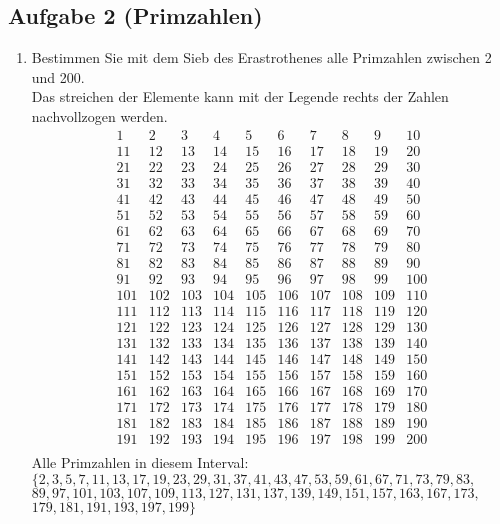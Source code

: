 \documentclass[11pt,a4paper,ngerman]{article}
\begin{document}
\subsection*{Aufgabe 2 (Primzahlen)}

\begin{enumerate}[\bfseries a)]

\item Bestimmen Sie mit dem Sieb des Erastrothenes alle Primzahlen zwischen 2 und 200. \\
Das streichen der Elemente kann mit der Legende rechts der Zahlen nachvollzogen werden.\\
$$
\begin{array}{cccccccccc}
1 & 2 & 3 & 4 & 5 & 6 & 7 & 8 & 9 & 10 \\
11 & 12 & 13 & 14 & 15 & 16 & 17 & 18 & 19 & 20 \\
21 & 22 & 23 & 24 & 25 & 26 & 27 & 28 & 29 & 30 \\
31 & 32 & 33 & 34 & 35 & 36 & 37 & 38 & 39 & 40 \\
41 & 42 & 43 & 44 & 45 & 46 & 47 & 48 & 49 & 50 \\
51 & 52 & 53 & 54 & 55 & 56 & 57 & 58 & 59 & 60 \\
61 & 62 & 63 & 64 & 65 & 66 & 67 & 68 & 69 & 70 \\
71 & 72 & 73 & 74 & 75 & 76 & 77 & 78 & 79 & 80 \\
81 & 82 & 83 & 84 & 85 & 86 & 87 & 88 & 89 & 90 \\
91 & 92 & 93 & 94 & 95 & 96 & 97 & 98 & 99 & 100 \\
101 & 102 & 103 & 104 & 105 & 106 & 107 & 108 & 109 & 110 \\
111 & 112 & 113 & 114 & 115 & 116 & 117 & 118 & 119 & 120 \\
121 & 122 & 123 & 124 & 125 & 126 & 127 & 128 & 129 & 130 \\
131 & 132 & 133 & 134 & 135 & 136 & 137 & 138 & 139 & 140 \\
141 & 142 & 143 & 144 & 145 & 146 & 147 & 148 & 149 & 150 \\
151 & 152 & 153 & 154 & 155 & 156 & 157 & 158 & 159 & 160 \\
161 & 162 & 163 & 164 & 165 & 166 & 167 & 168 & 169 & 170 \\
171 & 172 & 173 & 174 & 175 & 176 & 177 & 178 & 179 & 180 \\
181 & 182 & 183 & 184 & 185 & 186 & 187 & 188 & 189 & 190 \\
191 & 192 & 193 & 194 & 195 & 196 & 197 & 198 & 199 & 200 \\
\end{array}
$$
Alle Primzahlen in diesem Interval:\\
$\{2, 3, 5, 7, 11 ,13, 17, 19,23, 29, 31, 37, 41, 43, 47, 53, 59, 61, 67, 71, 73, 79, 83,$\\
$ 89, 97, 101, 103, 107, 109, 113, 127, 131, 137, 139, 149, 151, 157, 163, 167, 173,$\\
$ 179, 181, 191, 193, 197, 199\}$\\


\end{enumerate}
\end{document}
